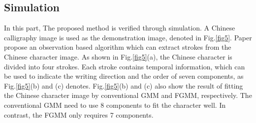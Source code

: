\documentclass[journal]{IEEEtran}
\begin{document}
\subsection{Simulation}
In this part, The proposed method is verified through simulation. A Chinese calligraphy image is used as the demonstration image, denoted in Fig.\ref{fig5}. Paper \cite{Li2022} propose an observation based algorithm which can extract strokes from the Chinese character image. As shown in Fig.\ref{fig5}(a), the Chinese character is divided into four strokes. Each stroke contains temporal information, which can be used to indicate the writing direction and the order of seven components, as Fig.\ref{fig5}(b) and (c) denotes. Fig.\ref{fig5}(b) and (c) also show the result of fitting the Chinese character image by conventional GMM and FGMM, respectively. The conventional GMM need to use 8 components to fit the character well. In contrast, the FGMM only requires 7 components.
\end{document}

